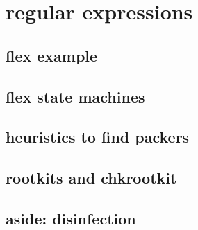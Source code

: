 

\section{regular expressions}


\subsection{flex example}


\subsection{flex state machines}



\subsection{heuristics to find packers}



\subsection{rootkits and chkrootkit}


\subsection{aside: disinfection}
